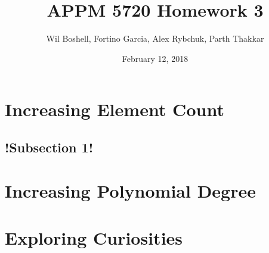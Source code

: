 \documentclass{article}
\title{APPM 5720 Homework 3}
\author{Wil Boshell, Fortino Garcia, Alex Rybchuk, Parth Thakkar}
\date{February 12, 2018}
\begin{document}

\maketitle

\section{Increasing Element Count}

\subsection{!Subsection 1!}

\section{Increasing Polynomial Degree}

\section{Exploring Curiosities}
\end{document}
